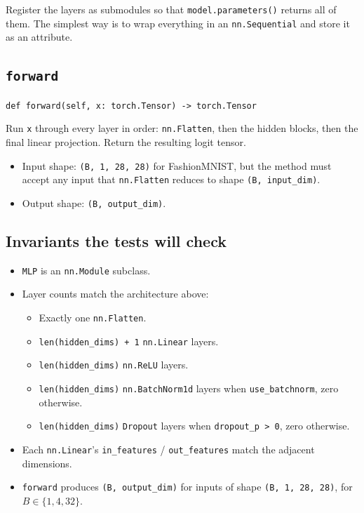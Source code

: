 \documentclass[11pt]{article}
\newcommand{\code}[1]{\texttt{\small #1}}
\begin{document}
\medskip\noindent
Register the layers as submodules so that \code{model.parameters()} returns
all of them. The simplest way is to wrap everything in an
\code{nn.Sequential} and store it as an attribute.

\subsection{\texttt{forward}}

\noindent
\code{def forward(self, x: torch.Tensor) -> torch.Tensor}

\medskip\noindent
Run \code{x} through every layer in order: \code{nn.Flatten}, then the
hidden blocks, then the final linear projection. Return the resulting logit
tensor.

\begin{itemize}
    \item Input shape: \code{(B, 1, 28, 28)} for FashionMNIST, but the
          method must accept any input that \code{nn.Flatten} reduces to
          shape \code{(B, input\_dim)}.
    \item Output shape: \code{(B, output\_dim)}.
\end{itemize}

\subsection*{Invariants the tests will check}

\begin{itemize}
    \item \code{MLP} is an \code{nn.Module} subclass.
    \item Layer counts match the architecture above:
    \begin{itemize}
        \item Exactly one \code{nn.Flatten}.
        \item \code{len(hidden\_dims) + 1} \code{nn.Linear} layers.
        \item \code{len(hidden\_dims)} \code{nn.ReLU} layers.
        \item \code{len(hidden\_dims)} \code{nn.BatchNorm1d} layers when
              \code{use\_batchnorm}, zero otherwise.
        \item \code{len(hidden\_dims)} \code{Dropout} layers when
              \code{dropout\_p > 0}, zero otherwise.
    \end{itemize}
    \item Each \code{nn.Linear}'s \code{in\_features} / \code{out\_features}
          match the adjacent dimensions.
    \item \code{forward} produces \code{(B, output\_dim)} for inputs of
          shape \code{(B, 1, 28, 28)}, for $B \in \{1, 4, 32\}$.
\end{itemize}
\end{document}
